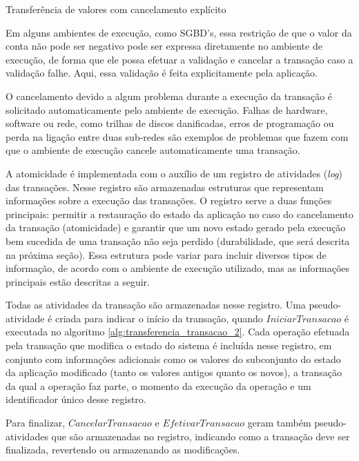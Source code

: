\documentclass[11pt,twoside,a4paper]{book}
\begin{document}
\begin{algorithm}
\caption{Transferência de valores com cancelamento explícito}
\label{alg:transferencia_transacao_2}
\end{algorithm}

Em alguns ambientes de execução, como SGBD's, essa restrição de que o valor da conta não pode ser negativo pode ser expressa diretamente no ambiente de execução, de forma que ele possa efetuar a validação e cancelar a transação caso a validação falhe. Aqui, essa validação é feita explicitamente pela aplicação.

O cancelamento devido a algum problema durante a execução da transação é solicitado automaticamente pelo ambiente de execução. Falhas de hardware, software ou rede, como trilhas de discos danificadas, erros de programação ou perda na ligação entre duas sub-redes são exemplos de problemas que fazem com que o ambiente de execução cancele automaticamente uma transação.

A atomicidade é implementada com o auxílio de um registro de atividades (\emph{log}) das transações. Nesse registro são armazenadas estruturas que representam informações sobre a execução das transações. O registro serve a duas funções principais: permitir a restauração do estado da aplicação no caso do cancelamento da transação (atomicidade) e garantir que um novo estado gerado pela execução bem sucedida de uma transação não seja perdido (durabilidade, que será descrita na próxima seção). Essa estrutura pode variar para incluir diversos tipos de informação, de acordo com o ambiente de execução utilizado, mas as informações principais estão descritas a seguir.

Todas as atividades da transação são armazenadas nesse registro. Uma pseudo-atividade é criada para indicar o início da transação, quando $IniciarTransacao$ é executada no algoritmo \ref{alg:transferencia_transacao_2}. Cada operação efetuada pela transação que modifica o estado do sistema é incluída nesse registro, em conjunto com informações adicionais como os valores do subconjunto do estado da aplicação modificado (tanto os valores antigos quanto os novos), a transação da qual a operação faz parte, o momento da execução da operação e um identificador único desse registro. 

Para finalizar, $CancelarTransacao$ e $EfetivarTransacao$ geram também pseudo-atividades que são armazenadas no registro, indicando como a transação deve ser finalizada, revertendo ou armazenando as modificações. 
\end{document}
